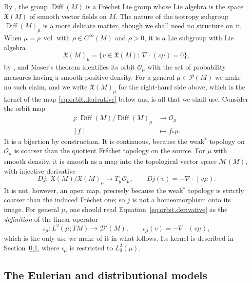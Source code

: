 \documentclass[11pt,reqno]{amsart}
\theoremstyle{plain}
\theoremstyle{definition}
\newcommand{\lto}{\longrightarrow}
\newcommand{\Prob}{\mathcal{P}}
\newcommand{\Dist}{\mathcal{D}'}
\DeclareMathOperator{\vol}{vol}
\begin{document}
By \cite{leslie_differential_1967}, the group \( \operatorname{Diff}(M) \) is a Fréchet Lie group whose Lie algebra is the space \( \mathfrak X(M) \) of smooth vector fields on \( M \).
The nature of the isotropy subgroup \( \operatorname{Diff}(M)_\mu \) is a more delicate matter, though we shall need no structure on it.
When \( \mu=\rho\,\vol \) with \( \rho\in C^\infty(M) \) and \( \rho>0 \), it is a Lie subgroup with Lie algebra
\[
    \mathfrak X(M)_\mu=\big\{v\in\mathfrak X(M):\ \nabla\!\cdot(v\mu)=0\big\},
\]
by \cite{ebin_groups_1970,omori_infinite_2006}, and Moser's theorem \cite{moser_volume_1965} identifies its orbit \( \mathcal O_\mu \) with the set of probability measures having a smooth positive density.
For a general \( \mu\in\Prob(M) \) we make no such claim, and we write \( \mathfrak X(M)_\mu \) for the right-hand side above, which is the kernel of the map \eqref{eq:orbit.derivative} below and is all that we shall use.
Consider the orbit map
\begin{align*}
    j:\operatorname{Diff}(M)/\operatorname{Diff}(M)_\mu&\lto\mathcal O_\mu \\
    [f]&\longmapsto f_\ast\mu .
\end{align*}
It is a bijection by construction.
It is continuous, because the weak\( ^\ast \) topology on \( \mathcal O_\mu \) is coarser than the quotient Fréchet topology on the source.
For \( \mu \) with smooth density, it is smooth as a map into the topological vector space \( \mathcal M(M) \), with injective derivative
\begin{equation}\label{eq:orbit.derivative}
    Dj:\ \mathfrak X(M)/\mathfrak X(M)_\mu\lto T_\mu\mathcal O_\mu,
    \qquad Dj(v)=-\nabla\!\cdot(v\mu).
\end{equation}
It is not, however, an open map, precisely because the weak\( ^\ast \) topology is strictly coarser than the induced Fréchet one; so \( j \) is not a homeomorphism onto its image.
For general \( \mu \), one should read Equation~\eqref{eq:orbit.derivative} as the \emph{definition} of the linear operator
\[
    \iota_\mu:L^2(\mu;TM)\lto\Dist(M),\qquad \iota_\mu(v)=-\nabla\!\cdot(v\mu),
\]
which is the only use we make of it in what follows.
Its kernel is described in Section~\ref{sec:tangent}, where \( \iota_\mu \) is restricted to \( L^2_0(\mu) \).


\subsection{The Eulerian and distributional models}
\label{sec:tangent}
\end{document}
